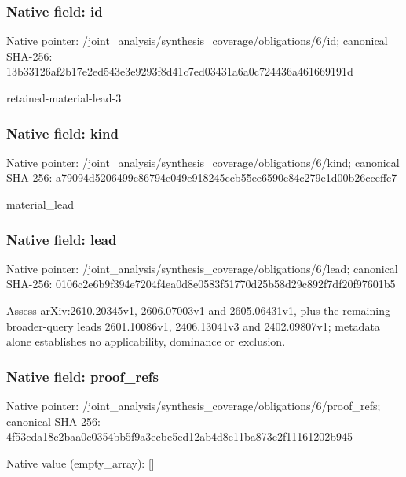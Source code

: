 \documentclass[10pt,a4paper]{article}
\begin{document}
\subsubsection{Native field: id}
Native pointer: /joint\_\allowbreak{}analysis/synthesis\_\allowbreak{}coverage/obligations/6/id; canonical SHA-256: 13b33126af2b17e2ed543e3e9293f8d41c7ed03431a6a0c724436a461669191d

\begingroup\raggedright\sloppy retained-material-lead-3\par\endgroup

\subsubsection{Native field: kind}
Native pointer: /joint\_\allowbreak{}analysis/synthesis\_\allowbreak{}coverage/obligations/6/kind; canonical SHA-256: a79094d5206499c86794e049e918245ccb55ee6590e84c279e1d00b26cceffc7

\begingroup\raggedright\sloppy material\_\allowbreak{}lead\par\endgroup

\subsubsection{Native field: lead}
Native pointer: /joint\_\allowbreak{}analysis/synthesis\_\allowbreak{}coverage/obligations/6/lead; canonical SHA-256: 0106c2e6b9f394e7204f4ea0d8e0583f51770d25b58d29c892f7df20f97601b5

\begingroup\raggedright\sloppy Assess arXiv:\allowbreak{}2610.20345v1,\allowbreak{} 2606.07003v1 and 2605.06431v1,\allowbreak{} plus the remaining broader-query leads 2601.10086v1,\allowbreak{} 2406.13041v3 and 2402.09807v1;\allowbreak{} metadata alone establishes no applicability,\allowbreak{} dominance or exclusion.\par\endgroup

\subsubsection{Native field: proof\_\allowbreak{}refs}
Native pointer: /joint\_\allowbreak{}analysis/synthesis\_\allowbreak{}coverage/obligations/6/proof\_\allowbreak{}refs; canonical SHA-256: 4f53cda18c2baa0c0354bb5f9a3ecbe5ed12ab4d8e11ba873c2f11161202b945

Native value (empty\_\allowbreak{}array): []
\end{document}
